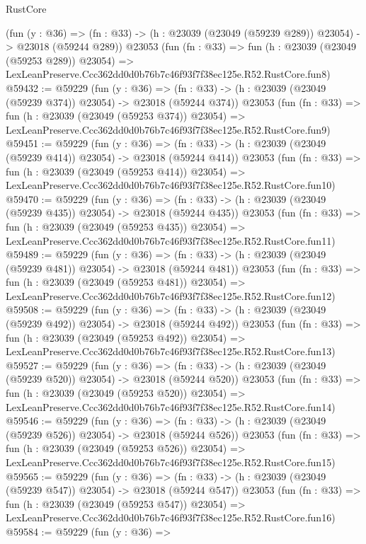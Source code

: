 \begin{lexlean}{RustCore}
\begin{coremodule}
    (fun (y : @36) =>
    (fn : @33) -> (h : @23039 (@23049 (@59239 @289)) @23054) -> @23018 (@59244 @289))
    @23053
    (fun (fn : @33) =>
    fun (h : @23039 (@23049 (@59253 @289)) @23054) =>
    LexLeanPreserve.Ccc362dd0d0b76b7c46f93f7f38ec125e.R52.RustCore.fun8)
@59432 := @59229
    (fun (y : @36) =>
    (fn : @33) -> (h : @23039 (@23049 (@59239 @374)) @23054) -> @23018 (@59244 @374))
    @23053
    (fun (fn : @33) =>
    fun (h : @23039 (@23049 (@59253 @374)) @23054) =>
    LexLeanPreserve.Ccc362dd0d0b76b7c46f93f7f38ec125e.R52.RustCore.fun9)
@59451 := @59229
    (fun (y : @36) =>
    (fn : @33) -> (h : @23039 (@23049 (@59239 @414)) @23054) -> @23018 (@59244 @414))
    @23053
    (fun (fn : @33) =>
    fun (h : @23039 (@23049 (@59253 @414)) @23054) =>
    LexLeanPreserve.Ccc362dd0d0b76b7c46f93f7f38ec125e.R52.RustCore.fun10)
@59470 := @59229
    (fun (y : @36) =>
    (fn : @33) -> (h : @23039 (@23049 (@59239 @435)) @23054) -> @23018 (@59244 @435))
    @23053
    (fun (fn : @33) =>
    fun (h : @23039 (@23049 (@59253 @435)) @23054) =>
    LexLeanPreserve.Ccc362dd0d0b76b7c46f93f7f38ec125e.R52.RustCore.fun11)
@59489 := @59229
    (fun (y : @36) =>
    (fn : @33) -> (h : @23039 (@23049 (@59239 @481)) @23054) -> @23018 (@59244 @481))
    @23053
    (fun (fn : @33) =>
    fun (h : @23039 (@23049 (@59253 @481)) @23054) =>
    LexLeanPreserve.Ccc362dd0d0b76b7c46f93f7f38ec125e.R52.RustCore.fun12)
@59508 := @59229
    (fun (y : @36) =>
    (fn : @33) -> (h : @23039 (@23049 (@59239 @492)) @23054) -> @23018 (@59244 @492))
    @23053
    (fun (fn : @33) =>
    fun (h : @23039 (@23049 (@59253 @492)) @23054) =>
    LexLeanPreserve.Ccc362dd0d0b76b7c46f93f7f38ec125e.R52.RustCore.fun13)
@59527 := @59229
    (fun (y : @36) =>
    (fn : @33) -> (h : @23039 (@23049 (@59239 @520)) @23054) -> @23018 (@59244 @520))
    @23053
    (fun (fn : @33) =>
    fun (h : @23039 (@23049 (@59253 @520)) @23054) =>
    LexLeanPreserve.Ccc362dd0d0b76b7c46f93f7f38ec125e.R52.RustCore.fun14)
@59546 := @59229
    (fun (y : @36) =>
    (fn : @33) -> (h : @23039 (@23049 (@59239 @526)) @23054) -> @23018 (@59244 @526))
    @23053
    (fun (fn : @33) =>
    fun (h : @23039 (@23049 (@59253 @526)) @23054) =>
    LexLeanPreserve.Ccc362dd0d0b76b7c46f93f7f38ec125e.R52.RustCore.fun15)
@59565 := @59229
    (fun (y : @36) =>
    (fn : @33) -> (h : @23039 (@23049 (@59239 @547)) @23054) -> @23018 (@59244 @547))
    @23053
    (fun (fn : @33) =>
    fun (h : @23039 (@23049 (@59253 @547)) @23054) =>
    LexLeanPreserve.Ccc362dd0d0b76b7c46f93f7f38ec125e.R52.RustCore.fun16)
@59584 := @59229
    (fun (y : @36) =>

\end{coremodule}
\end{lexlean}
